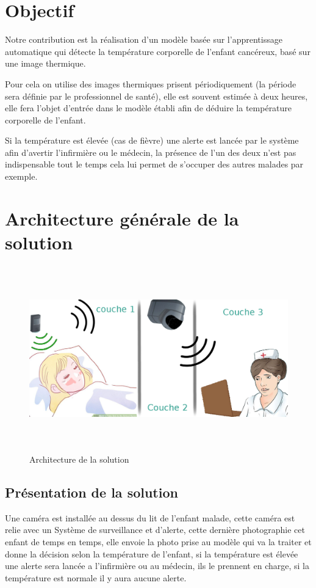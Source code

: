 \documentclass[12pt]{article}
\begin{document}
\section{Objectif}
Notre contribution est la réalisation d'un modèle basée sur l’apprentissage automatique qui détecte la température corporelle de l'enfant cancéreux, basé sur une image thermique.

Pour cela on utilise des images thermiques prisent périodiquement (la période sera définie par le professionnel de santé), elle est souvent estimée à deux heures, elle fera l’objet d’entrée dans le modèle établi afin de déduire la température corporelle de l’enfant.

Si la température est élevée (cas de fièvre) une alerte est lancée par le système afin d’avertir l'infirmière ou le médecin, la présence de l'un des deux n'est pas indispensable tout le temps cela lui permet de s’occuper des autres malades par exemple.
\section{Architecture générale de la solution}
\begin{figure}[h]
	\centering
	\includegraphics[height=8cm,width=15cm]{img-Chapiter-3/processus.png}
	\caption{Architecture de la solution}
	\label{fig:archgene}
\end{figure}
\newpage
\subsection{Présentation de la solution}
Une caméra est installée au dessus du lit de l'enfant malade, cette caméra est relie avec un Système de surveillance et d'alerte, cette dernière photographie cet enfant de temps en temps, elle envoie la photo prise au modèle qui va la traiter et donne la décision selon la température de l'enfant, si la température est élevée une alerte sera lancée a l'infirmière ou au médecin, ils le prennent en charge, si la température est normale il y aura aucune alerte.
\end{document}

